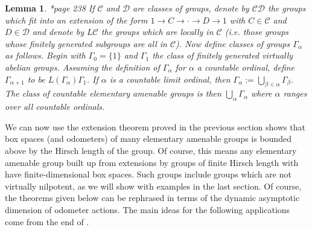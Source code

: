 \documentclass[12pt]{article}
\newtheorem{lemma}[theorem]{Lemma}
\begin{document}
{

\begin{lemma}\cite{MR1143191}*{page 238} If $\mathcal{C}$ and $\mathcal{D}$ are classes of groups, denote by $\mathcal{C}\mathcal{D}$ the groups which fit into an extension of the form $1\to C\to \cdot \to D\to 1$ with $C\in \mathcal{C}$ and $D\in \mathcal{D}$ and denote by $L\mathcal{C}$ the groups which are locally in $\mathcal{C}$ (i.e. those groups whose finitely generated subgroups are all in $\mathcal{C}$).  Now define classes of groups $\Gamma_\alpha$ as follows.  Begin with $\Gamma_0 = \{1\}$ and $\Gamma_1$ the class of finitely generated virtually abelian groups.  Assuming the definition of $\Gamma_\alpha$ for $\alpha$ a countable ordinal, define $\Gamma_{\alpha+1}$ to be $L(\Gamma_\alpha)\Gamma_1$.  If $\alpha$ is a countable limit ordinal, then $\Gamma_\alpha:=\bigcup_{\beta<\alpha}\Gamma_\beta$.  The class of countable elementary amenable groups is then $\bigcup_\alpha \Gamma_\alpha$ where $\alpha$ ranges over all countable ordinals.  \label{elementary amenable lemma} \end{lemma} 


\normalfont We can now use the extension theorem proved in the previous section shows that box spaces (and odometers) of many elementary amenable groups is bounded above by the Hirsch length of the group.  Of course, this means any elementary amenable group built up from extensions by groups of finite Hirsch length with have finite-dimensional box spaces.  Such groups include groups which are not virtually nilpotent, as we will show with examples in the last section.   Of course, the theorems given below can be rephrased in terms of the dynamic asymptotic dimension of odometer actions.  The main ideas for the following applications come from the end of \cite[Section 4]{finnsell2015asymptotic}.  

}
\end{document}
